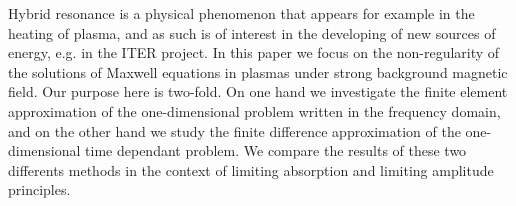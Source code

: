 Hybrid resonance is a physical phenomenon 
that appears for example in the heating of plasma, 
and as such is of interest in the developing of new sources of energy, 
e.g. in the ITER project. In this paper we focus on the non-regularity of
the solutions of Maxwell equations in plasmas 
under strong background magnetic field. 
Our purpose here is two-fold. 
On one hand we investigate the finite element approximation of the one-dimensional problem 
written in the frequency domain, 
and on the other hand we study the finite difference approximation 
of the one-dimensional time dependant problem. 
We compare the results of these two differents methods in the context of limiting absorption and limiting amplitude principles.